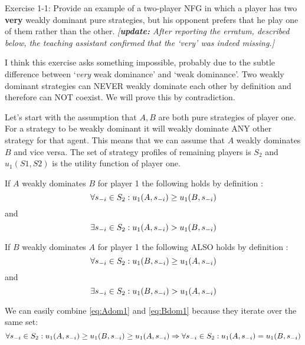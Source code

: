 \documentclass[../main.tex]{subfiles}
\begin{document}
\begin{question}
	Exercise 1-1: Provide an example of a two-player NFG in which a player has two \textbf{very} weakly dominant pure strategies, but his opponent prefers that he play one of them rather than the other.
	\textit{[\textbf{update:} After reporting the erratum, described below, the teaching assistant confirmed that the `very' was indeed missing.]}
\end{question}

\begin{solution}
	\label{twoweak}
	I think this exercise asks something impossible, probably due to the subtle difference between `\emph{very} weak dominance' and `weak dominance'.
	Two weakly dominant strategies can NEVER weakly dominate each other by definition and therefore can NOT coexist.
	We will prove this by contradiction.

	Let's start with the assumption that $A,B$ are both pure strategies of player one.
	For a strategy to be weakly dominant it will weakly dominate ANY other strategy for that agent.
	This means that we can assume that $A$ weakly dominates $B$ and vice versa.
	The set of strategy profiles of remaining players is $S_2$ and $u_1(S1,S2)$ is the utility function of player one.

	If $A$ weakly dominates $B$ for player 1 the following holds by definition :
	\begin{equation}
		\label{eq:Adom1}
		\forall s_{\--i} \in S_2 : u_1(A,s_{\--i}) \geq u_1(B,s_{\--i})
	\end{equation}
	and
	\begin{equation}
		\label{eq:Adom2}
		\exists s_{\--i} \in S_2 : u_1(A,s_{\--i}) > u_1(B,s_{\--i})
	\end{equation}

	If $B$ weakly dominates $A$ for player 1 the following ALSO holds by definition :
	\begin{equation}
		\label{eq:Bdom1}
		\forall s_{\--i} \in S_2 : u_1(B,s_{\--i}) \geq u_1(A,s_{\--i})
	\end{equation}
	and
	\begin{equation}
		\label{eq:Bdom2}
		\exists s_{\--i} \in S_2 : u_1(B,s_{\--i}) > u_1(A,s_{\--i})
	\end{equation}

	We can easily combine \autoref{eq:Adom1} and \autoref{eq:Bdom1} because they iterate over the same set:
	\begin{equation}
		\label{eq:equal}
		\forall s_{\--i} \in S_2 : u_1(A,s_{\--i}) \geq u_1(B,s_{\--i}) \geq u_1(A,s_{\--i}) \\ \Rightarrow \forall s_{\--i} \in S_2 :  u_1(A,s_{\--i}) = u_1(B,s_{\--i})
	\end{equation}


\end{solution}
\end{document}
